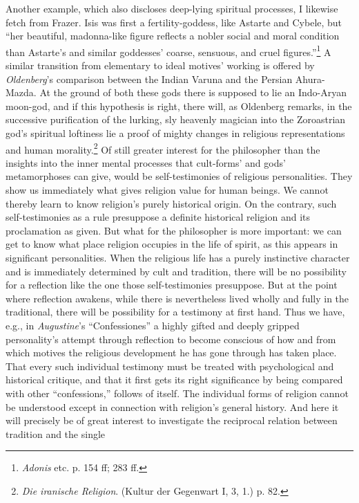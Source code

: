 \documentclass[12pt,a4paper]{book}
\newcommand{\opage}[1]{\marginnote{\footnotesize\textit{[#1]}}}
\begin{document}
Another example, which also discloses deep-lying spiritual processes, I likewise fetch from Frazer. Isis was
first a fertility-goddess, like Astarte and Cybele, but ``her beautiful, madonna-like figure reflects a nobler
social and moral condition than Astarte's and similar goddesses' coarse, sensuous, and cruel figures.''\footnote{\emph{Adonis}
etc. p. 154 ff; 283 ff.} A similar transition from elementary to ideal motives' working is offered by
\emph{Oldenberg}'s comparison between the Indian Varuna and the Persian Ahura-Mazda. At the ground of both these
gods there is supposed to lie an Indo-Aryan moon-god, and if this hypothesis is right, there will, as Oldenberg
remarks, in the successive purification of the lurking, sly heavenly magician into the Zoroastrian god's
spiritual loftiness lie a proof of mighty changes in religious representations and human morality.\footnote{\emph{Die
iranische Religion}. (Kultur der Gegenwart I, 3, 1.) p. 82.} Of still greater interest for the philosopher than
the insights into the inner mental processes that cult-forms' and gods' metamorphoses can give, would be
self-testimonies of religious personalities. They show us immediately what gives \opage{391}religion value for human
beings. We cannot thereby learn to know religion's purely historical origin. On the contrary, such
self-testimonies as a rule presuppose a definite historical religion and its proclamation as given. But what for
the philosopher is more important: we can get to know what place religion occupies in the life of spirit, as this
appears in significant personalities. When the religious life has a purely instinctive character and is
immediately determined by cult and tradition, there will be no possibility for a reflection like the one those
self-testimonies presuppose. But at the point where reflection awakens, while there is nevertheless lived wholly
and fully in the traditional, there will be possibility for a testimony at first hand. Thus we have, e.g., in
\emph{Augustine}'s ``Confessiones'' a highly gifted and deeply gripped personality's attempt through reflection
to become conscious of how and from which motives the religious development he has gone through has taken place.
That every such individual testimony must be treated with psychological and historical critique, and that it
first gets its right significance by being compared with other ``confessions,'' follows of itself. The individual
forms of religion cannot be understood except in connection with religion's general history. And here it will precisely be of great interest to investigate the reciprocal relation between tradition and the single
\end{document}
